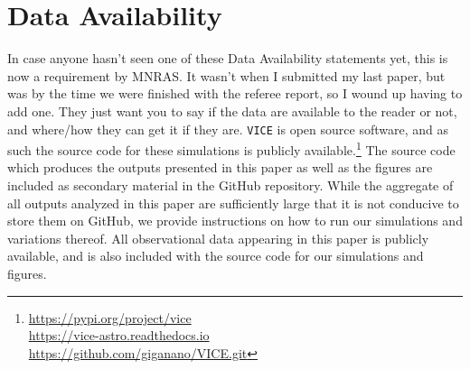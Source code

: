 \documentclass[a4paper, fleqn, usenatbib, useAMS]{mnras}
\begin{document}
\section{Data Availability} 
{\color{red} In case anyone hasn't seen one of these Data Availability 
statements yet, this is now a requirement by MNRAS. It wasn't when I submitted 
my last paper, but was by the time we were finished with the referee report, 
so I wound up having to add one. They just want you to say if the data are 
available to the reader or not, and where/how they can get it if they are. }
\texttt{VICE} is open source software, and as such the source code for these 
simulations is publicly available.\footnote{
	\url{https://pypi.org/project/vice} \\ 
	\url{https://vice-astro.readthedocs.io} \\ 
	\url{https://github.com/giganano/VICE.git} 
} The source code which produces the outputs presented in this paper as well as 
the figures are included as secondary material in the GitHub repository. 
While the aggregate of all outputs analyzed in this paper are sufficiently 
large that it is not conducive to store them on GitHub, we provide instructions 
on how to run our simulations and variations thereof. All observational data 
appearing in this paper is publicly available, and is also included with the 
source code for our simulations and figures. 
\end{document}

